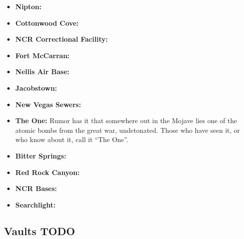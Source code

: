 \documentclass[11pt]{article} %
\begin{document}
\begin{itemize}
	\item \textbf{Nipton:}
	
	\item \textbf{Cottonwood Cove:}
	
	\item \textbf{NCR Correctional Facility:}
	
	\item \textbf{Fort McCarran:}
	
	\item \textbf{Nellis Air Base:}
	
	\item \textbf{Jacobstown:}
	
	\item \textbf{New Vegas Sewers:}
	
	\item \textbf{The One:} Rumor has it that somewhere out in the Mojave lies one of the atomic bombs from the great war, undetonated. Those who have seen it, or who know about it, call it ``The One''.
	
	\item \textbf{Bitter Springs:}
	
	\item \textbf{Red Rock Canyon:}
	
	\item \textbf{NCR Bases:}
	
	\item \textbf{Searchlight:}
\end{itemize}

\subsection{Vaults TODO}
\end{document}
